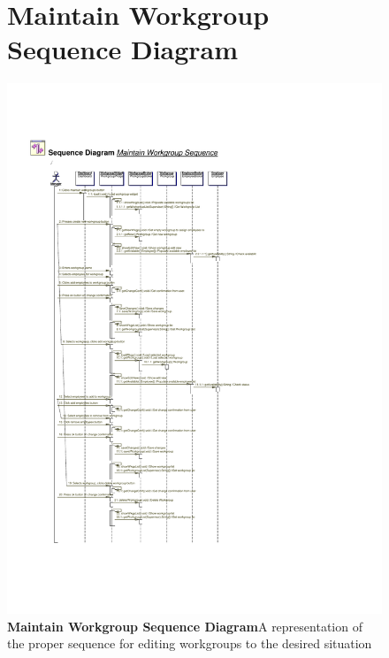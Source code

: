 \documentclass[letterpaper,12pt]{report}
\begin{document}
\begin{figure}[hbp]
 \section{Maintain Workgroup Sequence Diagram}
 \includegraphics[scale=0.65]{externals/SequenceDiagrams8.pdf}
 \caption{\small
\textbf{Maintain Workgroup Sequence Diagram}\newline A representation of the proper sequence for editing workgroups to the desired situation}\label{fig:seqMaintainWkgrp}
\end{figure}
\newpage
\end{document}
